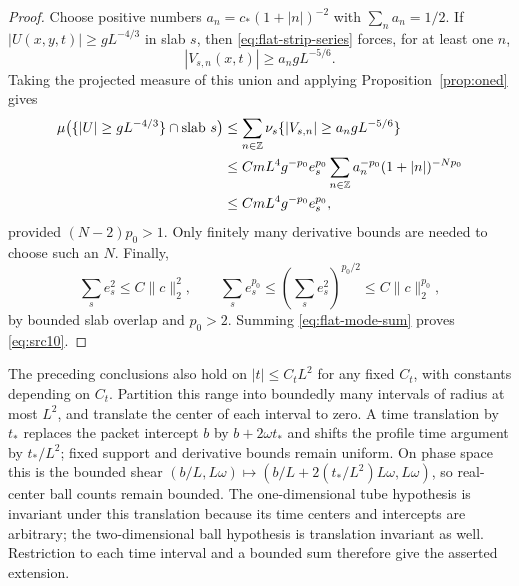 \begin{proof}
Choose positive numbers $a_n=c_*(1+|n|)^{-2}$ with
$\sum_n a_n=1/2$.  If $|U(x,y,t)|\geq gL^{-4/3}$ in slab $s$,
then \eqref{eq:flat-strip-series} forces, for at least one $n$,
\[
 |V_{s,n}(x,t)|\geq a_ngL^{-5/6}.
\]
Taking the projected measure of this union and applying
Proposition~\ref{prop:oned} gives
\begin{align}
 \mu\bigl(\{|U|\geq gL^{-4/3}\}\cap\text{slab }s\bigr)
 &\leq\sum_{n\in\mathbb Z}
       \nu_s\{|V_{s,n}|\geq a_ngL^{-5/6}\}
       \notag\\
 &\leq C mL^4g^{-p_0}e_s^{p_0}
       \sum_{n\in\mathbb Z}a_n^{-p_0}(1+|n|)^{-Np_0}
       \notag\\
 &\leq C mL^4g^{-p_0}e_s^{p_0},
       \label{eq:flat-mode-sum}
\end{align}
provided $(N-2)p_0>1$.  Only finitely many derivative bounds are
needed to choose such an $N$.  Finally,
\[
 \sum_s e_s^2\leq C\|c\|_2^2,
 \qquad
 \sum_s e_s^{p_0}
       \leq\left(\sum_s e_s^2\right)^{p_0/2}
       \leq C\|c\|_2^{p_0},
\]
by bounded slab overlap and $p_0>2$.  Summing
\eqref{eq:flat-mode-sum} proves \eqref{eq:src10}.
\end{proof}

\begin{remark}\label{rem:flat-time}
The preceding conclusions also hold on $|t|\leq C_tL^2$ for any fixed
$C_t$, with constants depending on $C_t$.  Partition this range into
boundedly many intervals of radius at most $L^2$, and translate the
center of each interval to zero.  A time translation by $t_*$ replaces
the packet intercept $b$ by $b+2\omega t_*$ and shifts the profile time
argument by $t_*/L^2$; fixed support and derivative bounds remain
uniform.  On phase space this is the bounded shear
$(b/L,L\omega)\mapsto(b/L+2(t_*/L^2)L\omega,L\omega)$,
so real-center ball counts remain bounded.  The one-dimensional
tube hypothesis is invariant under this translation because its
time centers and intercepts are arbitrary; the two-dimensional ball
hypothesis is translation invariant as well.  Restriction to each
time interval and a bounded sum therefore give the asserted extension.
\end{remark}
